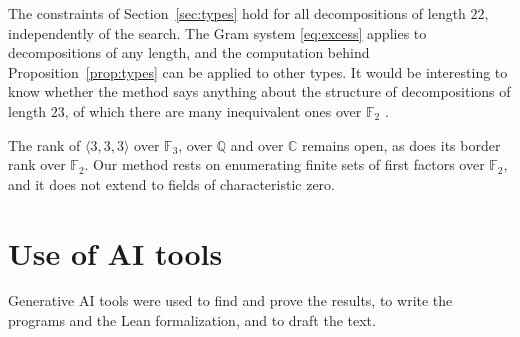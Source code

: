\documentclass[11pt]{amsart}
\theoremstyle{definition}
\theoremstyle{remark}
\numberwithin{equation}{section}
\newcommand{\F}{\mathbb{F}_2}
\newcommand{\mm}{\langle 3,3,3\rangle}
\begin{document}
The constraints of Section~\ref{sec:types} hold for all decompositions of length $22$, independently of the search. The Gram system \eqref{eq:excess} applies to decompositions of any length, and the computation behind Proposition~\ref{prop:types} can be applied to other types. It would be interesting to know whether the method says anything about the structure of decompositions of length $23$, of which there are many inequivalent ones over $\F$ \cite{CBH11,HKS21}.

The rank of $\mm$ over $\mathbb{F}_3$, over $\mathbb{Q}$ and over $\mathbb{C}$ remains open, as does its border rank over $\F$. Our method rests on enumerating finite sets of first factors over $\F$, and it does not extend to fields of characteristic zero.

\section*{Use of AI tools}
Generative AI tools were used to find and prove the results, to write the programs and the Lean formalization, and to draft the text.
\end{document}
